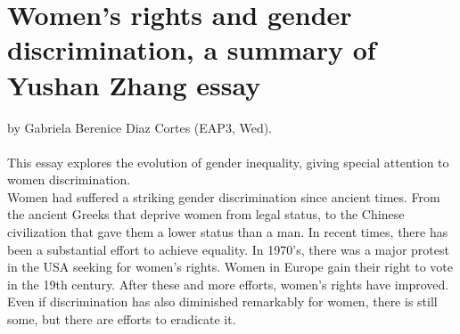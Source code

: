 \documentclass[a4paper,10pt]{article}
\begin{document}
\section*{Women's rights and gender discrimination, a summary of Yushan Zhang essay}
\hfill by Gabriela Berenice Diaz Cortes (EAP3, Wed).\\\\
\large This essay explores the evolution of gender inequality, giving special attention to women discrimination.\\
Women had suffered a striking gender discrimination since ancient times. From the ancient Greeks 
that deprive women from legal status, 
to the Chinese civilization that gave them a lower status than a man. 
In recent times, there has been a substantial effort to achieve equality.
In 1970's, there was a major protest in the USA seeking for women's rights. Women in Europe gain their 
right to vote in the 19th century.  
After these and more efforts, women's rights have improved. Even if discrimination has also diminished 
remarkably for women, there is still some, but there are efforts to eradicate it.   
\end{document}
